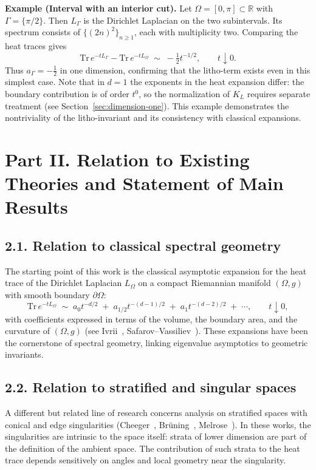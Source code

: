 \medskip
\noindent
\textbf{Example (Interval with an interior cut).}
Let $\Omega = [0,\pi] \subset \mathbb{R}$ with $\Gamma = \{\pi/2\}$. Then $L_\Gamma$ is the Dirichlet Laplacian on the two subintervals. Its spectrum consists of $\{(2n)^2\}_{n\geq 1}$, each with multiplicity two. Comparing the heat traces gives
\[
\mathrm{Tr}\, e^{-tL_\Gamma} - \mathrm{Tr}\, e^{-tL_\Omega}
\;\sim\; -\tfrac{1}{2} t^{-1/2}, \qquad t \downarrow 0.
\]
Thus $a_\Gamma = -\tfrac{1}{2}$ in one dimension, confirming that the litho-term exists even in this simplest case. Note that in $d=1$ the exponents in the heat expansion differ: the boundary contribution is of order $t^0$, so the normalization of $K_L$ requires separate treatment (see Section~\ref{sec:dimension-one}). This example demonstrates the nontriviality of the litho-invariant and its consistency with classical expansions.

\section*{Part II. Relation to Existing Theories and Statement of Main Results}

\subsection*{2.1. Relation to classical spectral geometry}
The starting point of this work is the classical asymptotic expansion for the heat trace of the Dirichlet Laplacian $L_\Omega$ on a compact Riemannian manifold $(\Omega,g)$ with smooth boundary $\partial \Omega$:
\[
\mathrm{Tr}\, e^{-t L_\Omega} \;\sim\; a_0 t^{-d/2} \;+\; a_{1/2} t^{-(d-1)/2} \;+\; a_1 t^{-(d-2)/2} \;+\; \cdots, 
\qquad t \downarrow 0,
\]
with coefficients expressed in terms of the volume, the boundary area, and the curvature of $(\Omega,g)$ 
(see Ivrii~\cite{Ivrii80}, Safarov--Vassiliev~\cite{SafarovVassiliev97}). 
These expansions have been the cornerstone of spectral geometry, linking eigenvalue asymptotics to geometric invariants.

\subsection*{2.2. Relation to stratified and singular spaces}
A different but related line of research concerns analysis on stratified spaces with conical and edge singularities 
(Cheeger~\cite{Cheeger83}, Brüning~\cite{Bruening84}, Melrose~\cite{Melrose93}). 
In these works, the singularities are intrinsic to the space itself: strata of lower dimension are part of the definition of the ambient space. 
The contribution of such strata to the heat trace depends sensitively on angles and local geometry near the singularity.

